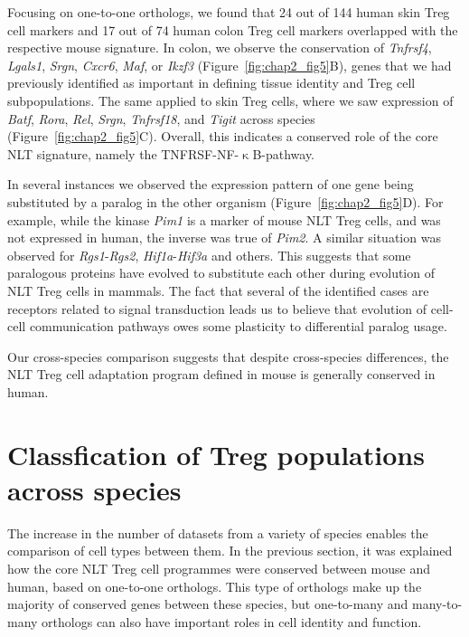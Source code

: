 Focusing on one-to-one orthologs, we found that 24 out of 144 human skin Treg cell markers and 17 out of 74 human colon Treg cell markers overlapped with the respective mouse signature. In colon, we observe the conservation of \textit{Tnfrsf4}, \textit{Lgals1}, \textit{Srgn}, \textit{Cxcr6}, \textit{Maf}, or \textit{Ikzf3} (Figure~\ref{fig:chap2_fig5}B), genes that we had previously identified as important in defining tissue identity and Treg cell subpopulations. The same applied to skin Treg cells, where we saw expression of \textit{Batf}, \textit{Rora}, \textit{Rel}, \textit{Srgn}, \textit{Tnfrsf18}, and \textit{Tigit} across species (Figure~\ref{fig:chap2_fig5}C). Overall, this indicates a conserved role of the core NLT signature, namely the TNFRSF-NF-${\upkappa}$B-pathway.

In several instances we observed the expression pattern of one gene being substituted by a paralog in the other organism (Figure~\ref{fig:chap2_fig5}D). For example, while the kinase \textit{Pim1} is a marker of mouse NLT Treg cells, and was not expressed in human, the inverse was true of \textit{Pim2}. A similar situation was observed for \textit{Rgs1}-\textit{Rgs2}, \textit{Hif1a}-\textit{Hif3a} and others. This suggests that some paralogous proteins have evolved to substitute each other during evolution of NLT Treg cells in mammals. The fact that several of the identified cases are receptors related to signal transduction leads us to believe that evolution of cell-cell communication pathways owes some plasticity to differential paralog usage.

Our cross-species comparison suggests that despite cross-species differences, the NLT Treg cell adaptation program defined in mouse is generally conserved in human. 


\section{Classfication of Treg populations across species}
\label{section2.7}
The increase in the number of datasets from a variety of species enables the comparison of cell types between them. In the previous section, it was explained how the core NLT Treg cell programmes were conserved between mouse and human, based on one-to-one orthologs. This type of orthologs make up the majority of conserved genes between these species, but one-to-many and many-to-many orthologs can also have important roles in cell identity and function.

